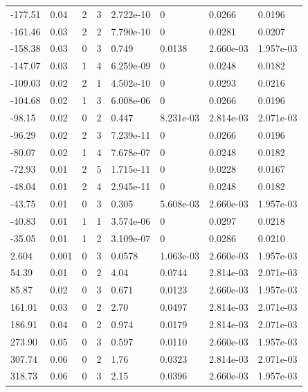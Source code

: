 \documentclass[preview]{standalone}
\begin{document}
{{\begin{tabular}{L{1.2cm}C{1.2cm} C{0.3cm}C{0.5cm} C{1.4cm}C{1.4cm} C{1.4cm}C{1.4cm}}
  -177.51  &  0.04  & 2     &  3 &  2.722e-10  & 0  & 0.0266 &  0.0196   \\ 
  -161.46  &  0.03  & 2     &  2 &  7.790e-10  & 0  & 0.0281 &  0.0207   \\ 
  -158.38  &  0.03  & 0     &  3 &  0.749  & 0.0138  & 2.660e-03 &  1.957e-03   \\ 
  -147.07  &  0.03  & 1     &  4 &  6.259e-09  & 0  & 0.0248 &  0.0182   \\ 
  -109.03  &  0.02  & 2     &  1 &  4.502e-10  & 0  & 0.0293 &  0.0216   \\ 
  -104.68  &  0.02  & 1     &  3 &  6.008e-06  & 0  & 0.0266 &  0.0196   \\ 
  -98.15  &  0.02  & 0     &  2 &  0.447  & 8.231e-03  & 2.814e-03 &  2.071e-03   \\ 
  -96.29  &  0.02  & 2     &  3 &  7.239e-11  & 0  & 0.0266 &  0.0196   \\ 
  -80.07  &  0.02  & 1     &  4 &  7.678e-07  & 0  & 0.0248 &  0.0182   \\ 
  -72.93  &  0.01  & 2     &  5 &  1.715e-11  & 0  & 0.0228 &  0.0167   \\ 
  -48.04  &  0.01  & 2     &  4 &  2.945e-11  & 0  & 0.0248 &  0.0182   \\ 
  -43.75  &  0.01  & 0     &  3 &  0.305  & 5.608e-03  & 2.660e-03 &  1.957e-03   \\ 
  -40.83  &  0.01  & 1     &  1 &  3.574e-06  & 0  & 0.0297 &  0.0218   \\ 
  -35.05  &  0.01  & 1     &  2 &  3.109e-07  & 0  & 0.0286 &  0.0210   \\ 
  2.604  &  0.001  & 0     &  3 &  0.0578  & 1.063e-03  & 2.660e-03 &  1.957e-03   \\ 
  54.39  &  0.01  & 0     &  2 &  4.04  & 0.0744  & 2.814e-03 &  2.071e-03   \\ 
  85.87  &  0.02  & 0     &  3 &  0.671  & 0.0123  & 2.660e-03 &  1.957e-03   \\ 
  161.01  &  0.03  & 0     &  2 &  2.70  & 0.0497  & 2.814e-03 &  2.071e-03   \\ 
  186.91  &  0.04  & 0     &  2 &  0.974  & 0.0179  & 2.814e-03 &  2.071e-03   \\ 
  273.90  &  0.05  & 0     &  3 &  0.597  & 0.0110  & 2.660e-03 &  1.957e-03   \\ 
  307.74  &  0.06  & 0     &  2 &  1.76  & 0.0323  & 2.814e-03 &  2.071e-03   \\ 
  318.73  &  0.06  & 0     &  3 &  2.15  & 0.0396  & 2.660e-03 &  1.957e-03   \\ 

\end{tabular}}}
\end{document}
